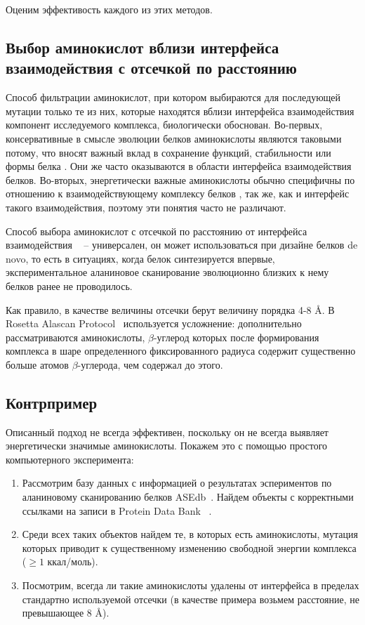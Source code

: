 Оценим эффективость каждого из этих методов.

\subsection{Выбор аминокислот вблизи интерфейса взаимодействия с отсечкой по расстоянию}

Способ фильтрации аминокислот, при котором выбираются для последующей мутации только те из них, которые находятся вблизи интерфейса взаимодействия компонент исследуемого комплекса, биологически обоснован. Во-первых,  консервативные в смысле эволюции белков аминокислоты являются таковыми потому, что вносят важный вклад в сохранение функций, стабильности или формы белка \cite{toadd}. Они же часто оказываются в области интерфейса взаимодействия белков. Во-вторых, энергетически важные аминокислоты обычно специфичны по отношению к взаимодействующему комплексу белков \cite{toadd1}, так же, как и интерфейс такого взаимодействия, поэтому эти понятия часто не различают.

Способ выбора аминокислот с  отсечкой по расстоянию от интерфейса взаимодействия ~\cite{kortemme2004} -- универсален, он может использоваться при дизайне белков de novo, то есть в ситуациях, когда белок синтезируется впервые, экспериментальное аланиновое сканирование эволюционно близких к нему белков ранее не проводилось. 

Как правило, в качестве величины отсечки берут величину порядка  4-8 \AA{}. В  Rosetta Alascan Protocol~\cite{kortemme2004} используется усложнение: дополнительно рассматриваются аминокислоты, $\beta$-углерод которых после формирования комплекса в шаре определенного фиксированного радиуса содержит существенно больше атомов $\beta$-углерода, чем содержал до этого.
\newpage
\subsection{Контрпример}
Описанный подход не всегда эффективен, поскольку он не всегда выявляет энергетически значимые аминокислоты. Покажем это с помощью простого компьютерного эксперимента:
\begin{enumerate}
\item Рассмотрим базу данных с информацией о результатах эспериментов по аланиновому сканированию белков ASEdb~\cite{asedb2001}. Найдем объекты с корректными ссылками на записи в Protein Data Bank ~\cite{rcsb}.
\item Среди всех таких объектов найдем те, в которых есть аминокислоты, мутация которых приводит к существенному изменению свободной энергии комплекса ($\geq 1$ ккал/моль).
\item Посмотрим, всегда ли такие аминокислоты удалены от интерфейса в пределах стандартно используемой отсечки (в качестве примера возьмем расстояние, не превышающее 8 \AA{}).
\end{enumerate}


